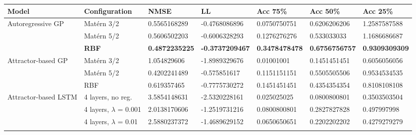 \documentclass[pdftex,10pt,a4paper,journal]{article}
\theoremstyle{definition}
\theoremstyle{remark}
\begin{document}
{\begin{landscape}
\begin{tabular}{|l|l|l|l|l|l|l|}
\hline
Model                                 & Configuration                        & NMSE                  & LL                     & Acc 75\%              & Acc 50\%              & Acc 25\%              \\ \hline
\multirow{3}{*}{Autoregressive GP}    & Mat\'ern 3/2                         & 0.5565168289          & -0.4768086896          & 0.0750750751          & 0.6206206206          & 1.2587587588          \\ \cline{2-7} 
                                      & Mat\'ern 5/2                         & 0.5606502203          & -0.6006328293          & 0.1276276276          & 0.533033033           & 1.1686686687          \\ \cline{2-7} 
                                      & \textbf{RBF}                         & \textbf{0.4872235225} & \textbf{-0.3737209467} & \textbf{0.3478478478} & \textbf{0.6756756757} & \textbf{0.9309309309} \\ \hline
\multirow{3}{*}{Attractor-based GP}   & Mat\'ern 3/2                         & 1.054829606           & -1.8989329676          & 0.01001001            & 0.1451451451          & 0.6056056056          \\ \cline{2-7} 
                                      & Mat\'ern 5/2                         & 0.4202241489          & -0.575851617           & 0.1151151151          & 0.5505505506          & 0.9534534535          \\ \cline{2-7} 
                                      & RBF                                  & 0.619357465           & -0.7775730272          & 0.1451451451          & 0.4354354354          & 0.8108108108          \\ \hline
\multirow{4}{*}{Attractor-based LSTM} & 4 layers, no reg.                    & 3.5854148631          & -2.5320228161          & 0.025025025           & 0.0800800801          & 0.3503503504          \\ \cline{2-7} 
                                      & 4 layers, $\lambda$ = 0.001          & 2.0138170606          & -1.2519731216          & 0.0800800801          & 0.2827827828          & 0.497997998           \\ \cline{2-7} 
                                      & 4 layers, $\lambda$ = 0.01           & 2.5880237372          & -1.4689629152          & 0.0650650651          & 0.2202202202          & 0.4279279279          \\ \cline{2-7} 

\end{tabular}
\end{landscape}}
\end{document}
